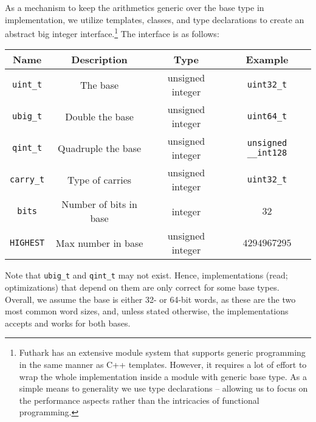 As a mechanism to keep the arithmetics generic over the base type in
implementation, we utilize templates, classes, and type declarations to create
an abstract big integer interface.\footnote{Futhark has an extensive module
  system that supports generic programming in the same manner as C++
  templates. However, it requires a lot of effort to wrap the whole
  implementation inside a module with generic base type. As a simple means to
  generality we use type declarations -- allowing us to focus on the performance
  aspects rather than the intricacies of functional programming.} The interface
is as follows:
\begin{center}
  \begin{tabular}{cccc}
    Name & Description & Type & Example\\
    \hline
    \texttt{uint\_t} & The base & unsigned integer & \texttt{uint32\_t}\\
    \texttt{ubig\_t} & Double the base & unsigned integer & \texttt{uint64\_t}\\
    \texttt{qint\_t} & Quadruple the base & unsigned integer & \texttt{unsigned \_\_int128}\\
    \texttt{carry\_t} & Type of carries & unsigned integer & \texttt{uint32\_t}\\
    \texttt{bits} & Number of bits in base & integer & $32$\\
    \texttt{HIGHEST} & Max number in base & unsigned integer & $4294967295$\\
  \end{tabular}
  \end{center}
  Note that \texttt{ubig\_t} and \texttt{qint\_t} may not exist. Hence,
  implementations (read; optimizations) that depend on them are only correct for
  some base types. Overall, we assume the base is either 32- or 64-bit words, as
  these are the two most common word sizes, and, unless stated otherwise, the
  implementations accepts and works for both bases.

